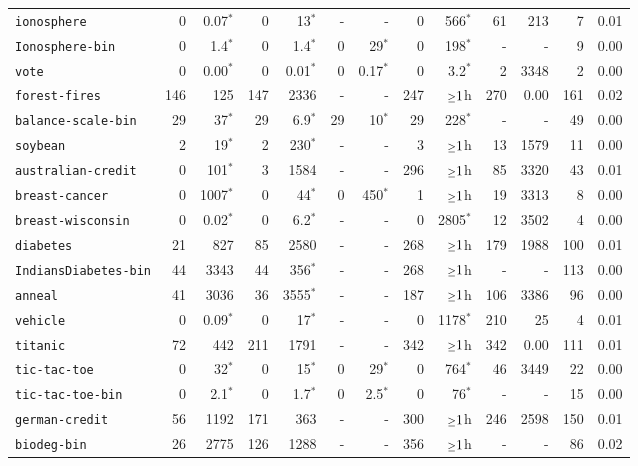 \begin{tabular}{lrrrrrrrrrrrr}
\texttt{ionosphere} & 0 & 0.07$^*$ & 0 & 13$^*$ & - & - & 0 & 566$^*$ & 61 & 213 & 7 & 0.01\\
\texttt{Ionosphere-bin} & 0 & 1.4$^*$ & 0 & 1.4$^*$ & 0 & 29$^*$ & 0 & 198$^*$ & - & - & 9 & 0.00\\
\texttt{vote} & 0 & 0.00$^*$ & 0 & 0.01$^*$ & 0 & 0.17$^*$ & 0 & 3.2$^*$ & 2 & 3348 & 2 & 0.00\\
\texttt{forest-fires} & 146 & 125 & 147 & 2336 & - & - & 247 & $\mathsmaller{\geq}1$h & 270 & 0.00 & 161 & 0.02\\
\texttt{balance-scale-bin} & 29 & 37$^*$ & 29 & 6.9$^*$ & 29 & 10$^*$ & 29 & 228$^*$ & - & - & 49 & 0.00\\
\texttt{soybean} & 2 & 19$^*$ & 2 & 230$^*$ & - & - & 3 & $\mathsmaller{\geq}1$h & 13 & 1579 & 11 & 0.00\\
\texttt{australian-credit} & 0 & 101$^*$ & 3 & 1584 & - & - & 296 & $\mathsmaller{\geq}1$h & 85 & 3320 & 43 & 0.01\\
\texttt{breast-cancer} & 0 & 1007$^*$ & 0 & 44$^*$ & 0 & 450$^*$ & 1 & $\mathsmaller{\geq}1$h & 19 & 3313 & 8 & 0.00\\
\texttt{breast-wisconsin} & 0 & 0.02$^*$ & 0 & 6.2$^*$ & - & - & 0 & 2805$^*$ & 12 & 3502 & 4 & 0.00\\
\texttt{diabetes} & 21 & 827 & 85 & 2580 & - & - & 268 & $\mathsmaller{\geq}1$h & 179 & 1988 & 100 & 0.01\\
\texttt{IndiansDiabetes-bin} & 44 & 3343 & 44 & 356$^*$ & - & - & 268 & $\mathsmaller{\geq}1$h & - & - & 113 & 0.00\\
\texttt{anneal} & 41 & 3036 & 36 & 3555$^*$ & - & - & 187 & $\mathsmaller{\geq}1$h & 106 & 3386 & 96 & 0.00\\
\texttt{vehicle} & 0 & 0.09$^*$ & 0 & 17$^*$ & - & - & 0 & 1178$^*$ & 210 & 25 & 4 & 0.01\\
\texttt{titanic} & 72 & 442 & 211 & 1791 & - & - & 342 & $\mathsmaller{\geq}1$h & 342 & 0.00 & 111 & 0.01\\
\texttt{tic-tac-toe} & 0 & 32$^*$ & 0 & 15$^*$ & 0 & 29$^*$ & 0 & 764$^*$ & 46 & 3449 & 22 & 0.00\\
\texttt{tic-tac-toe-bin} & 0 & 2.1$^*$ & 0 & 1.7$^*$ & 0 & 2.5$^*$ & 0 & 76$^*$ & - & - & 15 & 0.00\\
\texttt{german-credit} & 56 & 1192 & 171 & 363 & - & - & 300 & $\mathsmaller{\geq}1$h & 246 & 2598 & 150 & 0.01\\
\texttt{biodeg-bin} & 26 & 2775 & 126 & 1288 & - & - & 356 & $\mathsmaller{\geq}1$h & - & - & 86 & 0.02\\

\end{tabular}
